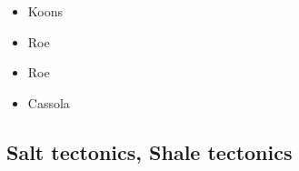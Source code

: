 \begin{scriptsize}
\begin{itemize}
\item[\nineteenninetyfour] Koons \cite{koon94}
\item[\twothousandsix] Roe \etal \cite{rosw06}
\item[\twothousandeight] Roe \etal \cite{rowf08}
\item[\twothousandthirteen] Cassola \cite{cass13}
\end{itemize}
\end{scriptsize}

\subsection{Salt tectonics, Shale tectonics}

